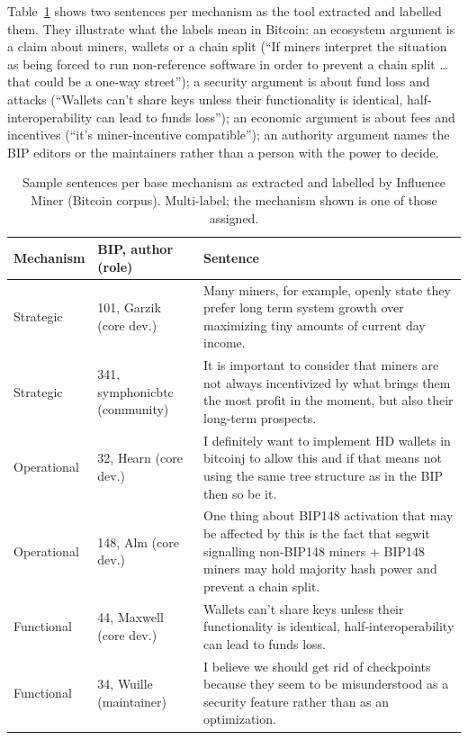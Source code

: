 \documentclass[sigconf,screen]{acmart}
\begin{document}
Table~\ref{tab:samples} shows two sentences per mechanism as the tool extracted and labelled them. They illustrate what the labels mean in Bitcoin: an ecosystem argument is a claim about miners, wallets or a chain split (``If miners interpret the situation as being forced to run non-reference software in order to prevent a chain split \ldots that could be a one-way street''); a security argument is about fund loss and attacks (``Wallets can't share keys unless their functionality is identical, half-interoperability can lead to funds loss''); an economic argument is about fees and incentives (``it's miner-incentive compatible''); an authority argument names the BIP editors or the maintainers rather than a person with the power to decide.

\begin{table}[t]
\caption{Sample sentences per base mechanism as extracted and labelled by Influence Miner (Bitcoin corpus). Multi-label; the mechanism shown is one of those assigned.}
\label{tab:samples}
\small
\begin{tabular}{p{}p{}p{}}
\toprule
Mechanism & BIP, author (role) & Sentence \\
\midrule
Strategic & 101, Garzik (core dev.) & Many miners, for example, openly state they prefer long term system growth over maximizing tiny amounts of current day income. \\
Strategic & 341, symphonicbtc (community) & It is important to consider that miners are not always incentivized by what brings them the most profit in the moment, but also their long-term prospects. \\
Operational & 32, Hearn (core dev.) & I definitely want to implement HD wallets in bitcoinj to allow this and if that means not using the same tree structure as in the BIP then so be it. \\
Operational & 148, Alm (core dev.) & One thing about BIP148 activation that may be affected by this is the fact that segwit signalling non-BIP148 miners + BIP148 miners may hold majority hash power and prevent a chain split. \\
Functional & 44, Maxwell (core dev.) & Wallets can't share keys unless their functionality is identical, half-interoperability can lead to funds loss. \\
Functional & 34, Wuille (maintainer) & I believe we should get rid of checkpoints because they seem to be misunderstood as a security feature rather than as an optimization. \\

\end{tabular}
\end{table}
\end{document}

